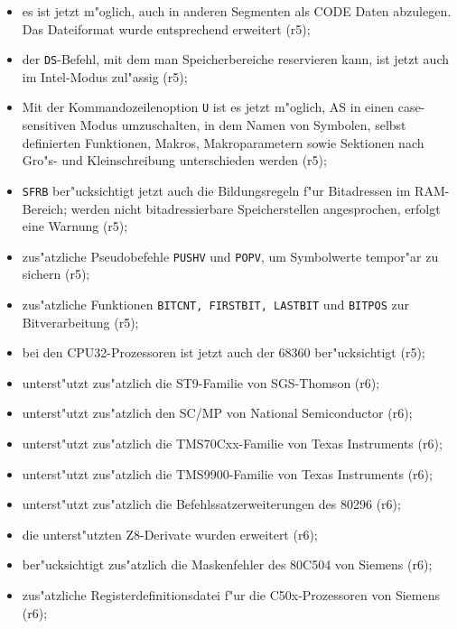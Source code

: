 \documentclass[12pt,a4paper,twoside]{report}
\newcommand{\tty}[1]{{\tt #1}}
\begin{document}
\begin{itemize}
{\begin{itemize}
{                 Gro"s- in Kleinbuchstaben umzuwandeln (r5);}
      \item{es ist jetzt m"oglich, auch in anderen Segmenten als
            CODE Daten abzulegen.  Das Dateiformat wurde entsprechend
            erweitert (r5);}
      \item{der \tty{DS}-Befehl, mit dem man Speicherbereiche reservieren
            kann, ist jetzt auch im Intel-Modus zul"assig (r5);}
      \item{Mit der Kommandozeilenoption \tty{U} ist es jetzt
            m"oglich, AS in einen case-sensitiven Modus umzuschalten,
            in dem Namen von Symbolen, selbst definierten Funktionen,
            Makros, Makroparametern sowie Sektionen nach Gro"s-
            und Kleinschreibung unterschieden werden (r5);}
      \item{\tty{SFRB} ber"ucksichtigt jetzt auch die Bildungsregeln
            f"ur Bitadressen im RAM-Bereich; werden nicht bitadressierbare
            Speicherstellen angesprochen, erfolgt eine Warnung (r5);}
      \item{zus"atzliche Pseudobefehle \tty{PUSHV} und \tty{POPV}, um
            Symbolwerte tempor"ar zu sichern (r5);}
      \item{zus"atzliche Funktionen \tty{BITCNT, FIRSTBIT, LASTBIT} und
                 \tty{BITPOS} zur Bitverarbeitung (r5);}
      \item{bei den CPU32-Prozessoren ist jetzt auch der 68360
            ber"ucksichtigt (r5);}
      \item{unterst"utzt zus"atzlich die ST9-Familie von SGS-Thomson (r6);}
      \item{unterst"utzt zus"atzlich den SC/MP von National Semiconductor
            (r6);}
      \item{unterst"utzt zus"atzlich die TMS70Cxx-Familie von Texas
            Instruments (r6);}
      \item{unterst"utzt zus"atzlich die TMS9900-Familie von Texas
            Instruments (r6);}
      \item{unterst"utzt zus"atzlich die Befehlssatzerweiterungen
            des 80296 (r6);}
      \item{die unterst"utzten Z8-Derivate wurden erweitert
            (r6);}
      \item{ber"ucksichtigt zus"atzlich die Maskenfehler des 80C504
            von Siemens (r6);}
      \item{zus"atzliche Registerdefinitionsdatei f"ur die C50x-Prozessoren
            von Siemens (r6);}

\end{itemize}}
\end{itemize}
\end{document}
